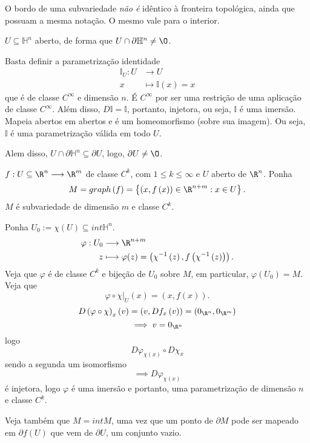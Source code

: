 \begin{observe}
    O bordo de uma subvariedade \emph{não é} idêntico à fronteira topológica, ainda que possuam a mesma notação. O mesmo vale para o interior.
\end{observe}

\begin{eg}
    $U\subseteq \mathbb{H}^{n}$ aberto, de forma que $U\cap \partial \mathbb{H}^{n}\neq \O$.

    Basta definir a parametrização identidade
    \begin{align*}
        \mathbb{I}_U : U &\longrightarrow U \\
        x &\longmapsto \mathbb{I} (x) = x
    \end{align*}
    que é de classe $C^{\infty}$ e dimensão $n$. É $C^{\infty}$ por ser uma restrição de uma aplicação de classe $C^{\infty}$. Além disso, $D\mathbb{I} = \mathbb{I}$, portanto, injetora, ou seja, $\mathbb{I}$ é uma imersão. Mapeia abertos em abertos e é um homeomorfismo (sobre sua imagem). Ou seja, $\mathbb{I}$ é uma parametrização válida em todo $U$.

    Alem disso, $U\cap \partial \mathbb{H}^{n}\subseteq \partial U$, logo, $\partial U \neq \O$.
\end{eg}

\begin{eg}
    $f: U\subseteq\R^{n} \longrightarrow \R^{m}$ de classe $C^{k}$, com $1\le k\le \infty$ e $U$ aberto de $\R^{n}$. Ponha \[
    M = graph\left( f \right) = \left\{ \left( x, f\left( x \right)  \right) \in \R^{n+m} : x\in U \right\} 
    .\] $M$ é subvariedade de dimensão $m$ e classe $C^{k}$.

    Ponha $U_0 := \chi\left( U \right) \subseteq int \mathbb{H}^{n}$.
    \begin{align*}
        \varphi : U_0 &\longrightarrow \R^{n+m} \\
        z &\longmapsto \varphi (z) = \left( \chi^{-1}\left( z \right) , f\left( \chi^{-1}\left( z \right)  \right)  \right) 
    .\end{align*}
    Veja que $\varphi $ é de classe $C^{k}$ e bijeção de $U_0$ sobre $M$, em particular, $\varphi \left( U_0 \right) = M$. Veja que \[
    \varphi \circ \chi\Big|_U\left( x \right) = \left( x, f\left( x \right)  \right) 
    .\] \[
    D\left( \varphi \circ \chi \right) _x \left( v \right) = \left( v, Df_x\left( v \right)  \right) = \left( 0_{\R^{n}}, 0_{\R^{m}} \right) 
    \] \[
    \implies v = 0_{\R^{n}}
    \] logo \[
    D\varphi _{\chi\left( x \right) } \circ D\chi_{x}
    \] sendo a segunda um isomorfismo\[
    \implies D\varphi _{\chi\left( x \right) }
\] é injetora, logo $\varphi $ é uma imersão e portanto, uma parametrização de dimensão $n$ e classe $C^{k}$.

Veja também que $M = int M$, uma vez que um ponto de $\partial M$ pode ser mapeado em $\partial f(U)$ que vem de $\partial U$, um conjunto vazio.
\end{eg}

